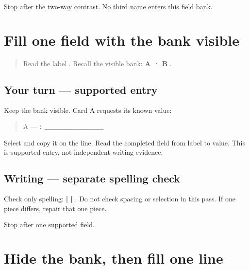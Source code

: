 \begin{tcolorbox}[breakable,colback=teal!4,colframe=teal!35!black,title={Before you move on}]
Stop after the two-way contrast. No third name enters this field bank.
\end{tcolorbox}
\section[\texorpdfstring{\pa{ਨਾਂ}: \pa{ਅਮਨ} (nāṁ: Aman)}{ਨਾਂ: ਅਮਨ (nāṁ: Aman)}]{Fill one field with the bank visible}

\label{lesson:PA-W02-name-supported}



\begin{quote}
Read the label \textbf{}. Recall the visible bank: \textbf{A  · B }.
\end{quote}

\subsection*{Your turn — supported entry}
Keep the bank visible. Card A requests its known value:

\begin{quote}
A — \textbf{: \_\_\_\_\_\_\_\_\_\_}
\end{quote}

Select \textbf{} and copy it on the line. Read the completed field from label to value. This is supported entry, not independent writing evidence.

\subsection*{Writing — separate spelling check}
Check only spelling: \textbf{ |  | }. Do not check spacing or selection in this pass. If one piece differs, repair that one piece.

\begin{tcolorbox}[breakable,colback=teal!4,colframe=teal!35!black,title={Before you move on}]
Stop after one supported field.
\end{tcolorbox}
\section[\texorpdfstring{B to \pa{ਮਨਨ} (B cue: Manan)}{B to ਮਨਨ (B cue: Manan)}]{Hide the bank, then fill one line}

\label{lesson:PA-W02-name-delayed}



